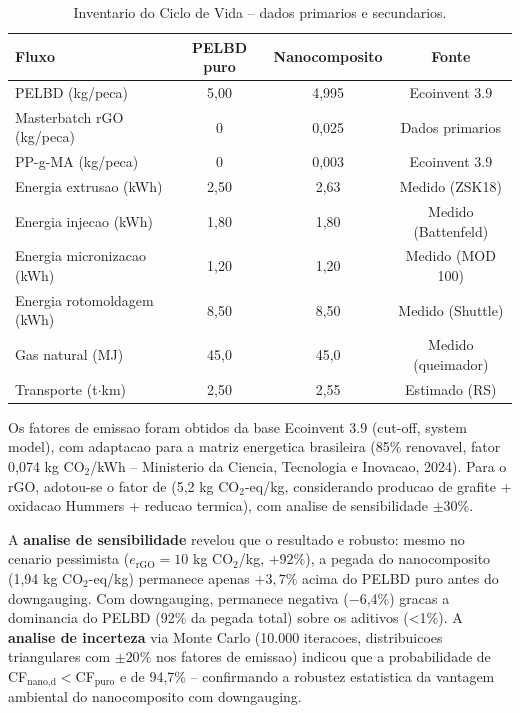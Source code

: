 \documentclass[11pt,a4paper,oneside]{article}
\begin{document}
\begin{table}[H]\centering
\caption{Inventario do Ciclo de Vida -- dados primarios e secundarios.}\label{tab:icv}
\begin{tabular}{lccc}
\toprule
{\bfseries Fluxo} & {\bfseries PELBD puro} & {\bfseries Nanocomposito} & {\bfseries Fonte} \\
\midrule
PELBD (kg/peca)          & 5{,}00  & 4{,}995 & Ecoinvent 3.9 \\
Masterbatch rGO (kg/peca) & 0       & 0{,}025 & Dados primarios \\
PP-g-MA (kg/peca)       & 0       & 0{,}003 & Ecoinvent 3.9 \\
Energia extrusao (kWh)  & 2{,}50  & 2{,}63  & Medido (ZSK18) \\
Energia injecao (kWh)   & 1{,}80  & 1{,}80  & Medido (Battenfeld) \\
Energia micronizacao (kWh) & 1{,}20 & 1{,}20  & Medido (MOD 100) \\
Energia rotomoldagem (kWh) & 8{,}50 & 8{,}50  & Medido (Shuttle) \\
Gas natural (MJ)        & 45{,}0  & 45{,}0  & Medido (queimador) \\
Transporte (t$\cdot$km) & 2{,}50  & 2{,}55  & Estimado (RS) \\
\bottomrule
\end{tabular}
\end{table}

Os fatores de emissao foram obtidos da base Ecoinvent 3.9 (cut-off, system model), com adaptacao para a matriz energetica brasileira (85\% renovavel, fator 0,074 kg CO$_2$/kWh -- Ministerio da Ciencia, Tecnologia e Inovacao, 2024). Para o rGO, adotou-se o fator de \citet{Araby2020} (5,2 kg CO$_2$-eq/kg, considerando producao de grafite + oxidacao Hummers + reducao termica), com analise de sensibilidade $\pm30\%$.

A {\bfseries analise de sensibilidade} revelou que o resultado e robusto: mesmo no cenario pessimista ($e_{\text{rGO}}{=}10$ kg CO$_2$/kg, $+92\%$), a pegada do nanocomposito (1,94 kg CO$_2$-eq/kg) permanece apenas $+3{,}7\%$ acima do PELBD puro antes do downgauging. Com downgauging, permanece negativa ($-$6{,}4\%) gracas a dominancia do PELBD (92\% da pegada total) sobre os aditivos (<1\%). A {\bfseries analise de incerteza} via Monte Carlo (10.000 iteracoes, distribuicoes triangulares com $\pm20\%$ nos fatores de emissao) indicou que a probabilidade de CF$_{\text{nano,d}}{<}$CF$_{\text{puro}}$ e de 94,7\% -- confirmando a robustez estatistica da vantagem ambiental do nanocomposito com downgauging.
\end{document}
